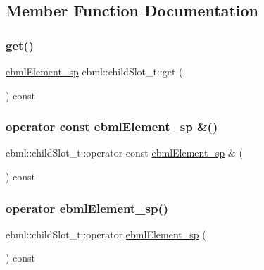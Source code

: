 \subsection{Member Function Documentation}
\mbox{\label{classebml_1_1childSlot__t_a12a2bd9fed9f797f01dfcfdb795c0bfe}} 
\subsubsection{\texorpdfstring{get()}{get()}}
{\footnotesize\ttfamily \mbox{\hyperlink{namespaceebml_adad533b7705a16bb360fe56380c5e7be}{ebml\+Element\+\_\+sp}} ebml\+::child\+Slot\+\_\+t\+::get (\begin{DoxyParamCaption}{ }\end{DoxyParamCaption}) const}

\mbox{\label{classebml_1_1childSlot__t_a78d2e16e95c39205b428fdcf775a0d24}} 
\subsubsection{\texorpdfstring{operator const ebml\+Element\+\_\+sp \&()}{operator const ebmlElement\_sp \&()}}
{\footnotesize\ttfamily ebml\+::child\+Slot\+\_\+t\+::operator const \mbox{\hyperlink{namespaceebml_adad533b7705a16bb360fe56380c5e7be}{ebml\+Element\+\_\+sp}} \& (\begin{DoxyParamCaption}{ }\end{DoxyParamCaption}) const}

\mbox{\label{classebml_1_1childSlot__t_aa824ac09e6c87bf304cf2479ba870b40}} 
\subsubsection{\texorpdfstring{operator ebml\+Element\+\_\+sp()}{operator ebmlElement\_sp()}}
{\footnotesize\ttfamily ebml\+::child\+Slot\+\_\+t\+::operator \mbox{\hyperlink{namespaceebml_adad533b7705a16bb360fe56380c5e7be}{ebml\+Element\+\_\+sp}} (\begin{DoxyParamCaption}{ }\end{DoxyParamCaption}) const}

